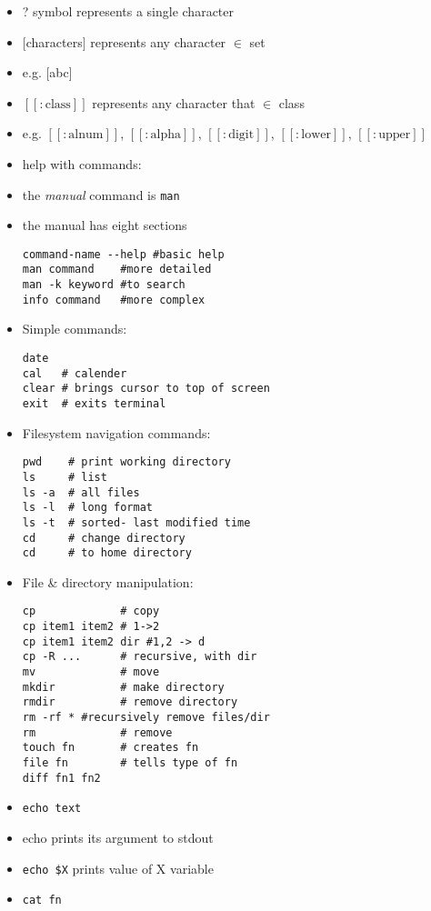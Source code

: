 \documentclass[twocolumn]{IEEEtran} %
\begin{document}
\begin{itemize}
        \item ? symbol represents a single character
        \item $[$characters$]$ represents any character $\in$ set
        \bi
            \item e.g. [abc]
        \ei
        \item $[[:\text{class}]]$ represents any character that $\in$ class
        \bi
            \item e.g. $[[:\text{alnum}]]$, $[[:\text{alpha}]]$, $[[:\text{digit}]]$, $[[:\text{lower}]]$, $[[:\text{upper}]]$
        \ei
    \ei
    \item help with commands:
    \bi
        \item the \emph{manual} command is \verb|man|
        \bi
            \item the manual has eight sections
        \ei
        \begin{verbatim}
command-name --help #basic help
man command    #more detailed
man -k keyword #to search
info command   #more complex
        \end{verbatim}
    \ei
    \item Simple commands:
    \begin{verbatim}
date
cal   # calender
clear # brings cursor to top of screen
exit  # exits terminal
    \end{verbatim}
    \item Filesystem navigation commands:
    \begin{verbatim}
pwd    # print working directory
ls     # list
ls -a  # all files
ls -l  # long format
ls -t  # sorted- last modified time
cd     # change directory
cd     # to home directory
    \end{verbatim}
    \item File \& directory manipulation:
    \begin{verbatim}
cp             # copy
cp item1 item2 # 1->2
cp item1 item2 dir #1,2 -> d
cp -R ...      # recursive, with dir
mv             # move
mkdir          # make directory
rmdir          # remove directory
rm -rf * #recursively remove files/dir
rm             # remove
touch fn       # creates fn
file fn        # tells type of fn
diff fn1 fn2
    \end{verbatim}
    \item \verb|echo text|
    \bi
        \item echo prints its argument to stdout
        \item \verb|echo $X| prints value of X variable
    \ei
    \item \verb|cat fn|

\end{itemize}
\end{document}
